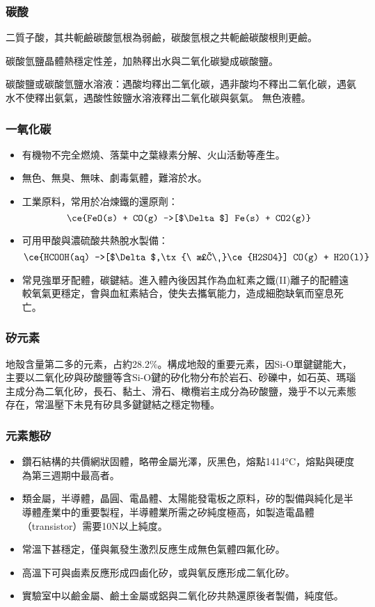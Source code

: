 \documentclass[a4paper,12pt]{report}
\begin{document}
\subsubsection{碳酸}
\bit
\item 二質子酸，其共軛鹼碳酸氫根為弱鹼，碳酸氫根之共軛鹼碳酸根則更鹼。
\item 碳酸氫鹽晶體熱穩定性差，加熱釋出水與二氧化碳變成碳酸鹽。
\item 碳酸鹽或碳酸氫鹽水溶液：遇酸均釋出二氧化碳，遇非酸均不釋出二氧化碳，遇氨水不使釋出氨氣，遇酸性銨鹽水溶液釋出二氧化碳與氨氣。
\eit
{}
無色液體。
\subsubsection{一氧化碳}
\begin{itemize}
\item 有機物不完全燃燒、落葉中之葉綠素分解、火山活動等產生。
\item 無色、無臭、無味、劇毒氣體，難溶於水。
\item 工業原料，常用於冶煉鐵的還原劑：
\[\ce{FeO(s) + CO(g) ->[$\Delta$] Fe(s) + CO2(g)}\]
\item 可用甲酸與濃硫酸共熱脫水製備：
\[\ce{HCOOH(aq) ->[$\Delta$,\tx{\ 濃\ }\ce{H2SO4}] CO(g) + H2O(l)}\]
\item 常見強單牙配體，碳鍵結。進入體內後因其作為血紅素之鐵(II)離子的配體遠較氧氣更穩定，會與血紅素結合，使失去攜氧能力，造成細胞缺氧而窒息死亡。
\end{itemize}
\subsubsection{矽元素}
地殼含量第二多的元素，占約28.2\%。構成地殼的重要元素，因Si-O單鍵鍵能大，主要以二氧化矽與矽酸鹽等含Si-O鍵的矽化物分布於岩石、砂礫中，如石英、瑪瑙主成分為二氧化矽，長石、黏土、滑石、橄欖岩主成分為矽酸鹽，幾乎不以元素態存在，常溫壓下未見有矽具多鍵鍵結之穩定物種。
\subsubsection{元素態矽}
\begin{itemize}
\item 鑽石結構的共價網狀固體，略帶金屬光澤，灰黑色，熔點1414°C，熔點與硬度為第三週期中最高者。
\item 類金屬，半導體，晶圓、電晶體、太陽能發電板之原料，矽的製備與純化是半導體產業中的重要製程，半導體業所需之矽純度極高，如製造電晶體（transistor）需要10N以上純度。
\item 常溫下甚穩定，僅與氟發生激烈反應生成無色氣體四氟化矽。
\item 高溫下可與鹵素反應形成四鹵化矽，或與氧反應形成二氧化矽。
\item  實驗室中以鹼金屬、鹼土金屬或鋁與二氧化矽共熱還原後者製備，純度低。
\end{itemize}
\end{document}
